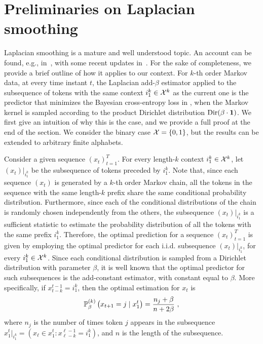 \newpage
\appendix
\onecolumn

\section{Preliminaries on Laplacian smoothing}
\label{app:laplace}

Laplacian smoothing is a mature and well understood topic. An account can be found, e.g., in~\cite{merhav1998,CesaBL:2006}, with some recent updates in~\cite{BondaschiG:24isit,bondaschi1}.
For the sake of completeness, we provide a brief outline of how it applies to our context. For $k$-th order Markov data, at every time instant $t$, the Laplacian add-$\beta$ estimator applied to the subsequence of tokens with the same context $i_1^k \in \mathcal{X}^k$ as the current one is the predictor that minimizes the Bayesian cross-entropy loss in , when the Markov kernel is sampled according to the product Dirichlet distribution $\mathrm{Dir}(\beta \cdot \bm{1})$. We first give an intuition of why this is the case, and we provide a full proof at the end of the section. We consider the binary case $\mathcal{X} = \{0,1\}$, but the results can be extended to arbitrary finite alphabets.

Consider a given sequence $(x_t)_{t=1}^T$. For every length-$k$ context $i_1^k \in \mathcal{X}^k$, let $(x_t)|_{i_1^k}$ be the subsequence of tokens preceded by $i_1^k$. Note that, since each sequence $(x_t)$ is generated by a $k$-th order Markov chain, all the tokens in the sequence with the same length-$k$ prefix share the same conditional probability distribution. Furthermore, since each of the conditional distributions of the chain is randomly chosen independently from the others, the subsequence $(x_t)|_{i_1^k}$ is a sufficient statistic to estimate the probability distribution of all the tokens with the same prefix $i_1^k$. Therefore, the optimal prediction for a sequence $(x_t)_{t=1}^T$ is given by employing the optimal predictor for each i.i.d. subsequence $(x_t)|_{i_1^k}$, for every $i_1^k \in \mathcal{X}^k$. Since each conditional distribution is sampled from a Dirichlet distribution with parameter $\beta$, it is well known that the optimal predictor for such subsequences is the add-constant estimator, with constant equal to $\beta$. More specifically, if $x_{t-k}^{t-1} = i_1^k$, then the optimal estimation for $x_t$ is
\begin{equation}
\label{eq:add-beta}
\mathbb{P}_{\beta}^{(k)}\left(x_{t+1} = j \mid x_1^t\right) = \frac{n_j + \beta}{n + 2\beta}\ ,
\end{equation}
where $n_j$ is the number of times token $j$ appears in the subsequence $x_1^t|_{i_1^k} = (x_{\ell} \in x_1^t : x_{\ell-k}^{\ell-1} = i_1^k)$, and $n$ is the length of the subsequence. 

